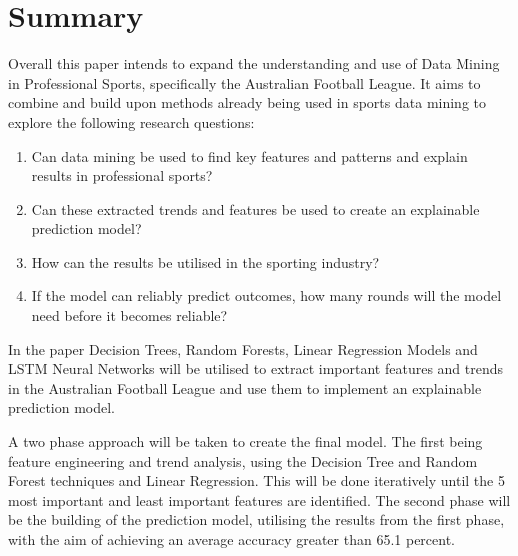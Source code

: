 \documentclass{imc-inf}
\begin{document}
	\section{Summary}
	Overall this paper intends to expand the understanding and use of Data Mining in Professional Sports, specifically the Australian Football League. It aims to combine and build upon methods already being used in sports data mining to explore the following research questions:
	\begin{enumerate}
		\item[] Can data mining be used to find key features and patterns and explain results in professional sports?
		\item[] Can these extracted trends and features be used to create an explainable prediction model?
		\item[] How can the results be utilised in the sporting industry?
		\item[] If the model can reliably predict outcomes, how many rounds will the model need before it becomes reliable?
	\end{enumerate}
	In the paper Decision Trees, Random Forests, Linear Regression Models and LSTM Neural Networks will be utilised to extract important features and trends in the Australian Football League and use them to implement an explainable prediction model.
	
	A two phase approach will be taken to create the final model. The first being feature engineering and trend analysis, using the Decision Tree and Random Forest techniques and Linear Regression. This will be done iteratively until the 5 most important and least important features are identified. The second phase will be the building of the prediction model, utilising the results from the first phase, with the aim of achieving an average accuracy greater than 65.1 percent.
	
	
	\newpage
	
	
\end{document}
